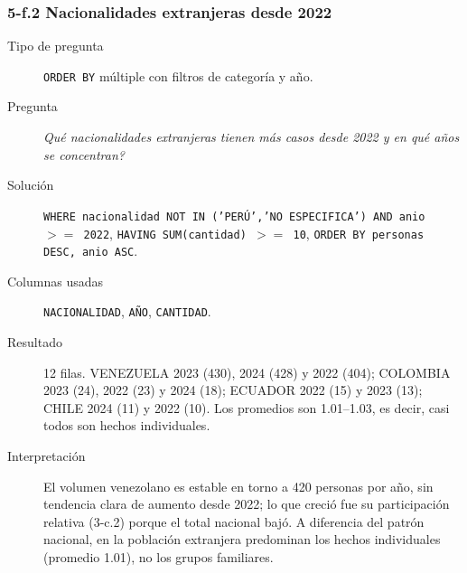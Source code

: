 \subsubsection*{5-f.2 \textbar{} Nacionalidades extranjeras desde 2022}
\begin{description}
\item[Tipo de pregunta] \texttt{ORDER BY} m\'ultiple con filtros de categor\'ia y a\~no.
\item[Pregunta] \emph{Qu\'e nacionalidades extranjeras tienen m\'as casos desde 2022 y en qu\'e
      a\~nos se concentran?}
\item[Soluci\'on] \texttt{WHERE nacionalidad NOT IN ('PER\'U','NO ESPECIFICA') AND anio $>=$ 2022},
      \texttt{HAVING SUM(cantidad) $>=$ 10}, \texttt{ORDER BY personas DESC, anio ASC}.
\item[Columnas usadas] \texttt{NACIONALIDAD}, \texttt{A\~NO}, \texttt{CANTIDAD}.
\item[Resultado] 12 filas. VENEZUELA 2023 (430), 2024 (428) y 2022 (404); COLOMBIA 2023 (24),
      2022 (23) y 2024 (18); ECUADOR 2022 (15) y 2023 (13); CHILE 2024 (11) y 2022 (10). Los
      promedios son 1.01--1.03, es decir, casi todos son hechos individuales.
\item[Interpretaci\'on] El volumen venezolano es estable en torno a 420 personas por a\~no, sin
      tendencia clara de aumento desde 2022; lo que creci\'o fue su participaci\'on relativa
      (3-c.2) porque el total nacional baj\'o. A diferencia del patr\'on nacional, en la
      poblaci\'on extranjera predominan los hechos individuales (promedio 1.01), no los grupos
      familiares.
\end{description}

